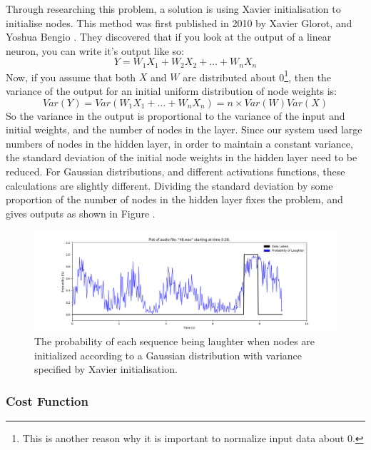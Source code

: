 \documentclass[a4paper,11pt,notitlepage]{article}
\begin{document}
Through researching this problem, a solution is using Xavier initialisation to initialise nodes. This method was first published in 2010 by Xavier Glorot, and Yoshua Bengio \cite{glorot2010understanding}. They discovered that if you look at the output of a linear neuron, you can write it's output like so:
\begin{equation}
Y = W_{1}X_{1} + W_{2}X_{2} + \ldots + W_{n}X_{n}
\end{equation}
Now, if you assume that both $X$ and $W$ are distributed about 0\footnote{This is another reason why it is important to normalize input data about 0.}, then the variance of the output for an initial uniform distribution of node weights is:
\begin{equation}
Var(Y) = Var(W_{1}X_{1} + \ldots + W_{n}X_{n}) = n\times Var(W)Var(X)
\end{equation}
So the variance in the output is proportional to the variance of the input and initial weights, and the number of nodes in the layer. Since our system used large numbers of nodes in the hidden layer, in order to maintain a constant variance, the standard deviation of the initial node weights in the hidden layer need to be reduced. For Gaussian distributions, and different activations functions, these calculations are slightly different. Dividing the standard deviation by some proportion of the number of nodes in the hidden layer fixes the problem, and gives outputs as shown in Figure .

\begin{figure}[H]
	\centering
	\vspace{0.5cm}
	\includegraphics[scale = 0.4]{figs/good_initialisation1.png}
	\caption{The probability of each sequence being laughter when nodes are initialized according to a Gaussian distribution with variance specified by Xavier initialisation.}
	\label{good_initialisation1}
\end{figure}

\subsubsection{Cost Function}
\end{document}
